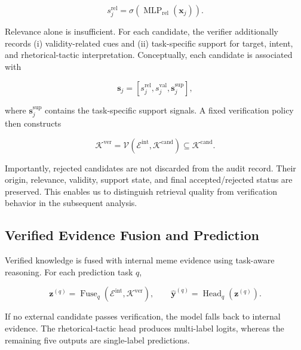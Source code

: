 \begin{equation}
s_j^{\mathrm{rel}}
=
\sigma\!\left(
\operatorname{MLP}_{\mathrm{rel}}(\mathbf{x}_j)
\right).
\label{eq:verifier_relevance}
\end{equation}

Relevance alone is insufficient.
For each candidate, the verifier additionally records
(i) validity-related cues and
(ii) task-specific support for target, intent, and rhetorical-tactic
interpretation.
Conceptually, each candidate is associated with

\begin{equation}
\mathbf{s}_j
=
\left[
s_j^{\mathrm{rel}},
s_j^{\mathrm{val}},
\mathbf{s}_j^{\mathrm{sup}}
\right],
\end{equation}

where $\mathbf{s}_j^{\mathrm{sup}}$ contains the task-specific support
signals.
A fixed verification policy then constructs

\begin{equation}
\mathcal{K}^{\mathrm{ver}}
=
\mathcal{V}
\left(
\mathcal{E}^{\mathrm{int}},
\mathcal{K}^{\mathrm{cand}}
\right)
\subseteq
\mathcal{K}^{\mathrm{cand}}.
\label{eq:verified_bank}
\end{equation}

Importantly, rejected candidates are not discarded from the audit
record.
Their origin, relevance, validity, support state, and final
accepted/rejected status are preserved.
This enables us to distinguish retrieval quality from verification
behavior in the subsequent analysis.


\subsection{Verified Evidence Fusion and Prediction}
\label{sec:method:fusion}

Verified knowledge is fused with internal meme evidence using
task-aware reasoning.
For each prediction task $q$,

\begin{equation}
\mathbf{z}^{(q)}
=
\operatorname{Fuse}_{q}
\left(
\mathcal{E}^{\mathrm{int}},
\mathcal{K}^{\mathrm{ver}}
\right),
\qquad
\hat{\mathbf{y}}^{(q)}
=
\operatorname{Head}_{q}
\left(
\mathbf{z}^{(q)}
\right).
\label{eq:task_fusion}
\end{equation}

If no external candidate passes verification, the model falls back to
internal evidence.
The rhetorical-tactic head produces multi-label logits, whereas the
remaining five outputs are single-label predictions.

